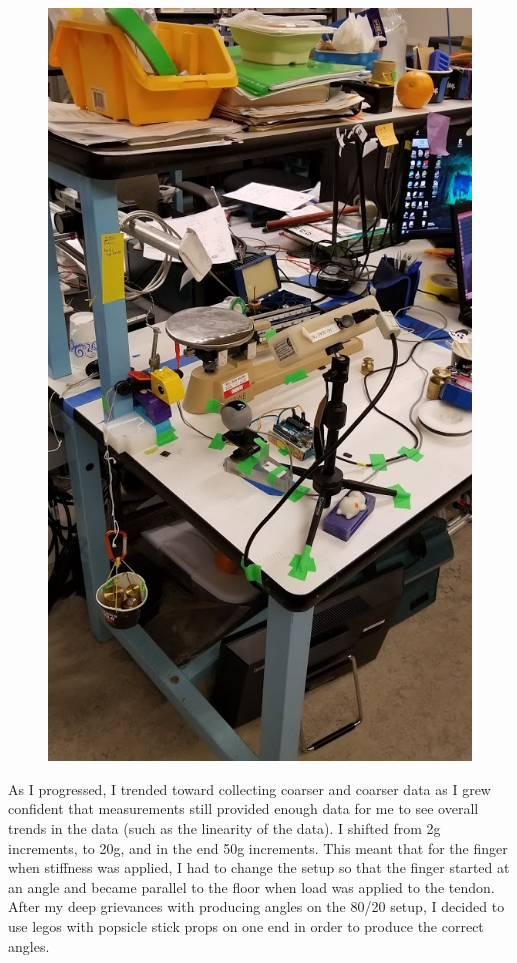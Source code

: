 \documentclass[12pt]{article}
\begin{document}
\begin{figure}[H]
\centering
\includegraphics[width=.8\textwidth]{images/setup/loading.jpg}
\end{figure}%

As I progressed, I trended toward collecting coarser and coarser data as I grew confident
that measurements still provided enough data for me to see overall trends in the data
(such as the linearity of the data). I shifted from 2g increments, to 20g, and in the end 50g
increments. This meant that for the finger when stiffness was applied, I had to change the setup so
that the finger started at an angle and became parallel to the floor when load was applied to the
tendon. After my deep grievances with producing angles on the 80/20 setup, I decided to use legos
with popsicle stick props on one end in order to produce the correct angles.
\end{document}
